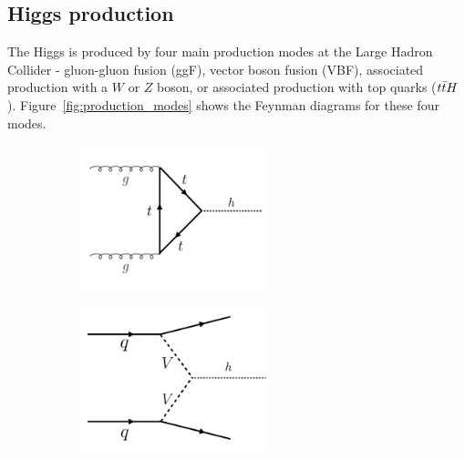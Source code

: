 \subsection{Higgs production}

The Higgs is produced by four main production modes at the Large Hadron Collider - gluon-gluon fusion (ggF), vector boson fusion (VBF), associated production with a $W$ or $Z$ boson, or associated production with top quarks ($t\bar{t} H$). Figure~\ref{fig:production_modes} shows the Feynman diagrams for these four modes. 

\begin{figure}[h!]
  \centering
  \captionsetup{justification=centering}

   \begin{subfigure}[t]{0.5\textwidth}
        \centering
        \includegraphics[width=0.6\textwidth]{figures/ggF_Higgs}
        \caption{}
    \end{subfigure}%
    \begin{subfigure}[t]{0.5\textwidth}
        \centering
        \includegraphics[width=0.6\textwidth]{figures/VBF_Higgs}
        \caption{}
    \end{subfigure}


\end{figure}
